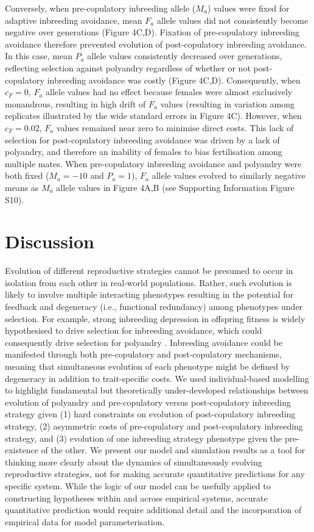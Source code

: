 \documentclass[10pt,letterpaper]{article}
\begin{document}
Conversely, when pre-copulatory inbreeding allele ($M_{a}$) values were fixed for adaptive inbreeding avoidance, mean $F_{a}$ allele values did not consistently become negative over generations (Figure 4C,D). Fixation of pre-copulatory inbreeding avoidance therefore prevented evolution of post-copulatory inbreeding avoidance. In this case, mean $P_{a}$ allele values consistently decreased over generations, reflecting selection against polyandry regardless of whether or not post-copulatory inbreeding avoidance was costly (Figure 4C,D). Consequently, when $c_{F}=0$, $F_{a}$ allele values had no effect because females were almost exclusively monandrous, resulting in high drift of $F_{a}$ values (resulting in variation among replicates illustrated by the wide standard errors in Figure 4C). However, when $c_{F}=0.02$, $F_{a}$ values remained near zero to minimise direct costs. This lack of selection for post-copulatory inbreeding avoidance was driven by a lack of polyandry, and therefore an inability of females to bias fertilisation among multiple mates. When pre-copulatory inbreeding avoidance and polyandry were both fixed ($M_{a}=-10$ and $P_{a}=1$), $F_{a}$ allele values evolved to similarly negative means as $M_{a}$ allele values in Figure 4A,B (see Supporting Information Figure S10). 


\section*{Discussion}

Evolution of different reproductive strategies cannot be presumed to occur in isolation from each other in real-world populations. Rather, such evolution is likely to involve multiple interacting phenotypes resulting in the potential for feedback and degeneracy (i.e., functional redundancy) among phenotypes under selection. For example, strong inbreeding depression in offspring fitness is widely hypothesised to drive selection for inbreeding avoidance, which could consequently drive selection for polyandry \cite[e.g., ][]{Zeh1997, Jennions2000, Tregenza2002}. Inbreeding avoidance could be manifested through both pre-copulatory and post-copulatory mechanisms, meaning that simultaneous evolution of each phenotype might be defined by degeneracy in addition to trait-specific costs. We used individual-based modelling to highlight fundamental but theoretically under-developed relationships between evolution of polyandry and pre-copulatory versus post-copulatory inbreeding strategy given (1) hard constraints on evolution of post-copulatory inbreeding strategy, (2) asymmetric costs of pre-copulatory and post-copulatory inbreeding strategy, and (3) evolution of one inbreeding strategy phenotype given the pre-existence of the other. We present our model and simulation results as a tool for thinking more clearly about the dynamics of simultaneously evolving reproductive strategies, not for making accurate quantitative predictions for any specific system. While the logic of our model can be usefully applied to constructing hypotheses within and across empirical systems, accurate quantitative prediction would require additional detail and the incorporation of empirical data for model parameterisation.
\end{document}
